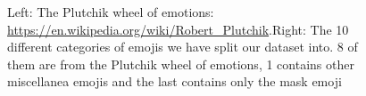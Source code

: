 \documentclass[11pt]{article}
\begin{document}
\begin{figure}[!ht]
    \centering
    \label{fig:plu_wheel}
    \caption{Left: The Plutchik wheel of emotions: \url{https://en.wikipedia.org/wiki/Robert_Plutchik}.Right: The 10 different categories of emojis we have split our dataset into. 8 of them are from the Plutchik wheel of emotions, 1 contains other miscellanea emojis and the last contains only the mask emoji}%
    \label{fig:Mapped_emojis}%
\end{figure}
\end{document}
